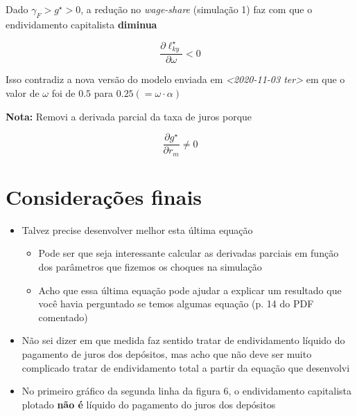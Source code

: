 \documentclass[11pt]{article}
\begin{document}
Dado \(\gamma_F > g^\star > 0\), a redução no \emph{wage-share} (simulação 1) faz com que o endividamento capitalista \textbf{diminua}

$$
\frac{\partial \ell_{ky}^\star}{\partial \omega} < 0
$$

Isso contradiz a nova versão do modelo enviada em \textit{<2020-11-03 ter> } em que o valor de \(\omega\) foi de \(0.5\) para \(0. 25 (= \omega\cdot \alpha)\)   

\textbf{Nota:} Removi a derivada parcial da taxa de juros porque

$$
\frac{\partial g^\star}{\partial r_m} \neq 0
$$


\section*{Considerações finais}
\label{sec:org5faa777}

\begin{itemize}
\item Talvez precise desenvolver melhor esta última equação
\begin{itemize}
\item Pode ser que seja interessante calcular as derivadas parciais em função dos parâmetros que fizemos os choques na simulação
\item Acho que essa última equação pode ajudar a explicar um resultado que você havia perguntado se temos algumas equação (p. 14 do PDF comentado)
\end{itemize}
\item Não sei dizer em que medida faz sentido tratar de endividamento líquido do pagamento de juros dos depósitos, mas acho que não deve ser muito complicado tratar de endividamento total a partir da equação que desenvolvi
\item No primeiro gráfico da segunda linha da figura 6, o endividamento capitalista plotado \textbf{não é} líquido do pagamento do juros dos depósitos
\end{itemize}
\end{document}
